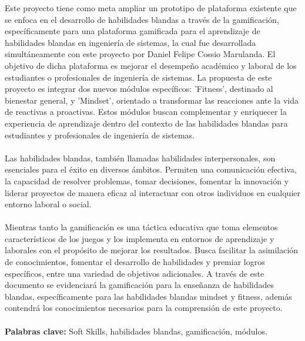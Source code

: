 Este proyecto tiene como meta ampliar un prototipo de plataforma existente que se enfoca en el desarrollo de habilidades blandas a través de la gamificación, específicamente para una plataforma gamificada para el aprendizaje de habilidades blandas en ingeniería de sistemas, la cual fue desarrollada simultáneamente con este proyecto por Daniel Felipe Cossio Marulanda. El objetivo de dicha plataforma es mejorar el desempeño académico y laboral de los estudiantes o profesionales de ingeniería de sistemas. La propuesta de este proyecto es integrar dos nuevos módulos específicos: 'Fitness', destinado al bienestar general, y 'Mindset', orientado a transformar las reacciones ante la vida de reactivas a proactivas. Estos módulos buscan complementar y enriquecer la experiencia de aprendizaje dentro del contexto de las habilidades blandas para estudiantes y profesionales de ingeniería de sistemas.
\\ \\
Las habilidades blandas, también llamadas habilidades interpersonales, son esenciales para el éxito en diversos ámbitos. Permiten una comunicación efectiva, la capacidad de resolver problemas, tomar decisiones, fomentar la innovación y liderar proyectos de manera eficaz al interactuar con otros individuos en cualquier entorno laboral o social.
\\ \\
Mientras tanto la gamificación es una táctica educativa que toma elementos característicos de los juegos y los implementa en entornos de aprendizaje y laborales con el propósito de mejorar los resultados. Busca facilitar la asimilación de conocimientos, fomentar el desarrollo de habilidades y premiar logros específicos, entre una variedad de objetivos adicionales. A través de este documento se evidenciará la gamificación para la enseñanza de habilidades blandas, específicamente para las habilidades blandas mindset y fitness, además contendrá los conocimientos necesarios para la comprensión de este proyecto.
\\ \\
\textbf{Palabras clave:} Soft Skills, habilidades blandas, gamificación, módulos.